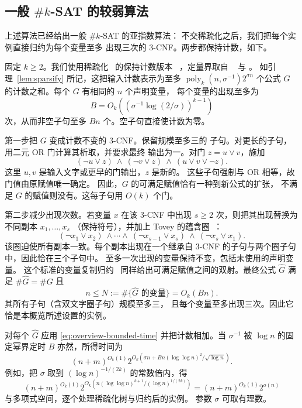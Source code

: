\subsection{一般 \texorpdfstring{$\#k$-SAT}{\#k-SAT} 的较弱算法}
\label{subsec:preview-general-sat}
上述算法已经给出一般 $\#k$-SAT 的亚指数算法：
不交稀疏化之后，我们把每个实例直接归约为每个变量至多
出现三次的 $3$-CNF。两步都保持计数，如下。

固定 $k\ge2$。我们使用稀疏化~\cite{IPZ} 的保持计数版本
~\cite[Appendix~A]{DHMTW}，定量界取自
~\cite[Section~6]{CIP} 与
\cite[Lemma~5.14 and equation~(5.4)]{CalabroThesis}。
如引理~\ref{lem:sparsify} 所记，这把输入计数表示为至多
$\operatorname{poly}_k(n,\sigma^{-1})2^{\sigma n}$ 个公式
$G$ 的计数之和。每个 $G$ 有相同的 $n$ 个声明变量，
每个变量的出现至多为
\[
 B=O_k\!\left((\sigma^{-1}\log(2/\sigma))^{k-1}\right)
\]
次，从而非空子句至多 $Bn$ 个。空子句直接使计数为零。

第一步把 $G$ 变成计数不变的 $3$-CNF。保留规模至多三的
子句。对更长的子句，用二元 OR 门计算其析取，并要求最终
输出为一。对门 $z=u\vee v$，施加
\[
 (\neg u\vee z)\ \wedge\ (\neg v\vee z)\ \wedge\
 (u\vee v\vee\neg z).
\]
这里 $u,v$ 是输入文字或更早的门输出，$z$ 是新的。
这些子句强制与 OR 相等，故门值由原赋值唯一确定。
因此，$G$ 的可满足赋值恰有一种到新公式的扩张，
不满足 $G$ 的赋值则没有。这每子句用 $O(k)$ 个门。

第二步减少出现次数。若变量 $x$ 在该 $3$-CNF 中出现
$s\ge2$ 次，则把其出现替换为不同副本 $x_1,\ldots,x_s$
（保持符号），并加上 Tovey 的蕴含圈~\cite[p.~86]{Tov84}：
\[
 (\neg x_1\vee x_2)\ \wedge\cdots\wedge\
 (\neg x_{s-1}\vee x_s)\ \wedge\ (\neg x_s\vee x_1).
\]
该圈迫使所有副本一致。每个副本出现在一个继承自 $3$-CNF
的子句与两个圈子句中，因此恰在三个子句中。
至多一次出现的变量保持不变，包括未使用的声明变量。
这个标准的变量复制归约~\cite[Proposition~4.7]{Gol08}
同样给出可满足赋值之间的双射。最终公式 $\widehat G$
满足 $\#\widehat G=\#G$ 且
\[
 n\le N:=\#\{\text{$\widehat G$ 的变量}\}=O_k(Bn).
\]
其所有子句（含双文字圈子句）规模至多三，
且每个变量至多出现三次。因此它恰是本概览所述设置的实例。

对每个 $\widehat G$ 应用 \eqref{eq:overview-bounded-time}
并把计数相加。当 $\sigma^{-1}$ 被 $\log n$ 的固定幂界定时
$B$ 亦然，所得时间为
\[
 (n+m)^{O_k(1)}
 2^{O_k\!\left(\sigma n+
          Bn(\log\log n)^2/\sqrt{\log n}\right)}.
\]
例如，把 $\sigma$ 取到 $(\log n)^{-1/(2k)}$ 的常数倍内，得
\[
 (n+m)^{O_k(1)}
 2^{O_k\!\left(n(\log\log n)^{k+1}/(\log n)^{1/(2k)}\right)}
   = (n+m)^{O_k(1)}2^{o(n)}
\]
与多项式空间，逐个处理稀疏化树与归约后的实例。
参数 $\sigma$ 可取有理数。

